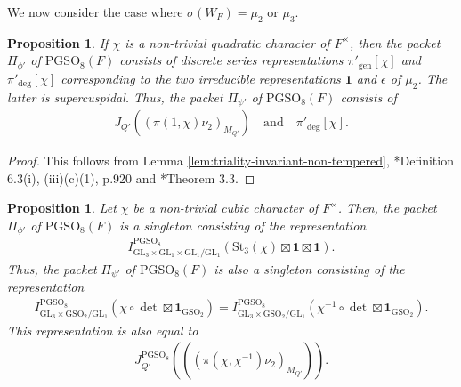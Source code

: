 \documentclass[12pt]{amsart}
\theoremstyle{definition}
\theoremstyle{plain}
\newtheorem{proposition}[definition]{Proposition}
\theoremstyle{remark}
\def\GL{\mathrm{GL}}
\def\GSO{\mathrm{GSO}}
\def\PGSO{\mathrm{PGSO}}
\numberwithin{equation}{section}
\newcommand{\gen}{\mathrm{gen}}
\newcommand{\St}{\mathrm{St}}
\begin{document}
We now consider the case where $\sigma(W_F) = \mu_2$ or $\mu_3$.

\begin{proposition}\label{prop:subregular-quadratic-A-packet-lift-SO8}
      If $\chi$ is a non-trivial quadratic character of $F^{\times}$, then the packet $\Pi_{\phi'}$ of $\PGSO_8(F)$ consists of discrete series representations $\pi'_{\gen}[\chi]$ and $\pi'_{\deg}[\chi]$ corresponding to the two irreducible representations $\mathbf{1}$ and $\epsilon$ of $\mu_2$.
      The latter is supercuspidal.
      Thus, the packet $\Pi_{\psi'}$ of $\PGSO_8(F)$ consists of 
      \begin{align*}
            J_{Q'}
            ((\pi(1, \chi)\nu_2)_{M_{Q'}}) \quad \text{and} \quad \pi'_{\deg}[\chi].
      \end{align*}
\end{proposition}

\begin{proof}
      This follows from Lemma \ref{lem:triality-invariant-non-tempered}, \cite{Xu2017-MoeglinParametrizationArthurPackets}*{Definition 6.3(i), (iii)(c)(1), p.920} and \cite{Xu2017-CuspidalSupportDiscreteSeries}*{Theorem 3.3}.
\end{proof}


\begin{proposition}\label{prop:subregular-cubic-A-packet-lift-SO8}
      Let $\chi$ be a non-trivial cubic character of $F^{\times}$.
      Then, the packet $\Pi_{\phi'}$ of $\PGSO_8(F)$ is a singleton consisting of the representation
      \begin{align*}
            I^{\PGSO_8}_{\GL_3 \times \GL_1 \times \GL_1/\GL_1}(\St_{3}(\chi) \boxtimes \mathbf{1} \boxtimes \mathbf{1}). 
      \end{align*} 
      Thus, the packet $\Pi_{\psi'}$ of $\PGSO_8(F)$ is also a singleton consisting of the representation
      \begin{align*}
            I^{\PGSO_8}_{\GL_3 \times \GSO_2 / \GL_1}(\chi \circ \det \boxtimes \mathbf{1}_{\GSO_2}) 
            = I^{\PGSO_8}_{\GL_3 \times \GSO_2 / \GL_1}(\chi^{-1} \circ \det \boxtimes \mathbf{1}_{\GSO_2}).
      \end{align*}
      This representation is also equal to 
      \begin{align*}
            J^{\PGSO_8}_{Q'}(((\pi(\chi, \chi^{-1})\nu_2)_{M_{Q'}})).
      \end{align*}
\end{proposition}
\end{document}

